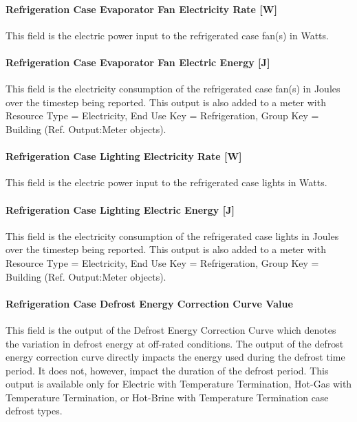 \paragraph{Refrigeration Case Evaporator Fan Electricity Rate {[}W{]}}\label{refrigeration-case-evaporator-fan-electric-power-w}

This field is the electric power input to the refrigerated case fan(s) in Watts.

\paragraph{Refrigeration Case Evaporator Fan Electric Energy {[}J{]}}\label{refrigeration-case-evaporator-fan-electric-energy-j}

This field is the electricity consumption of the refrigerated case fan(s) in Joules over the timestep being reported. This output is also added to a meter with Resource Type = Electricity, End Use Key = Refrigeration, Group Key = Building (Ref. Output:Meter objects).

\paragraph{Refrigeration Case Lighting Electricity Rate {[}W{]}}\label{refrigeration-case-lighting-electric-power-w}

This field is the electric power input to the refrigerated case lights in Watts.

\paragraph{Refrigeration Case Lighting Electric Energy {[}J{]}}\label{refrigeration-case-lighting-electric-energy-j}

This field is the electricity consumption of the refrigerated case lights in Joules over the timestep being reported. This output is also added to a meter with Resource Type = Electricity, End Use Key = Refrigeration, Group Key = Building (Ref. Output:Meter objects).

\paragraph{Refrigeration Case Defrost Energy Correction Curve Value}\label{refrigeration-case-defrost-energy-correction-curve-value}

This field is the output of the Defrost Energy Correction Curve which denotes the variation in defrost energy at off-rated conditions. The output of the defrost energy correction curve directly impacts the energy used during the defrost time period. It does not, however, impact the duration of the defrost period. This output is available only for Electric with Temperature Termination, Hot-Gas with Temperature Termination, or Hot-Brine with Temperature Termination case defrost types.

